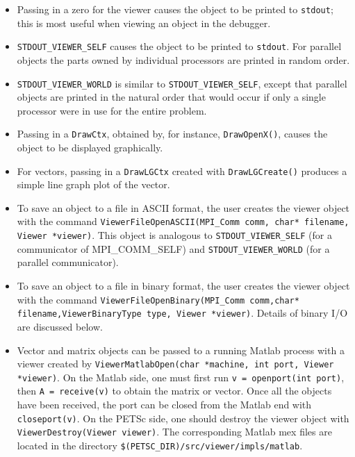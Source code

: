 \begin{itemize}
\item Passing in a zero for the viewer causes the object to be printed 
      to {\tt stdout}; this is most useful when viewing an object in 
      the debugger.
\item {\tt STDOUT\_VIEWER\_SELF} 
      causes the object to be printed to {\tt stdout}.
      For parallel objects the parts owned by individual processors are 
      printed in random order.
\item {\tt STDOUT\_VIEWER\_WORLD} 
      is similar to {\tt STDOUT\_VIEWER\_SELF}, except that 
      parallel objects are printed in the natural order that would occur
      if only a single processor were in use for the entire problem.
\item Passing in a {\tt DrawCtx}, obtained by, for instance, 
      {\tt DrawOpenX()}, causes the object to be displayed graphically.
\item For vectors, passing in a {\tt DrawLGCtx} created with 
      {\tt DrawLGCreate()} produces a simple line graph plot of the vector.
\item To save an object to a file in ASCII format, the user creates
      the viewer object with the command
      {\tt ViewerFileOpenASCII(MPI\_Comm comm, char* filename, Viewer *viewer)}.  
      This object is 
      analogous to {\tt STDOUT\_VIEWER\_SELF} (for a communicator of
      MPI\_COMM\_SELF) and 
      {\tt STDOUT\_VIEWER\_WORLD} (for a parallel communicator).
\item To save an object to a file in binary format, the user creates
      the viewer object with the command
      {\tt ViewerFileOpenBinary(MPI\_Comm comm,char* filename,ViewerBinaryType type,
      Viewer *viewer)}.   Details of binary
      I/O are discussed below.
\item Vector and matrix objects can be passed to a running Matlab process
      with a viewer created by {\tt ViewerMatlabOpen(char *machine,
      int port, Viewer *viewer)}.  On the 
      Matlab side, one must first run {\tt v = openport(int port)}, then 
      {\tt A = receive(v)} to obtain the matrix or vector. Once all the 
      objects have been received, the port can be closed from the 
      Matlab end with {\tt closeport(v)}. On the PETSc side, one should
      destroy the viewer object with 
      {\tt ViewerDestroy(Viewer viewer)}. The corresponding Matlab mex 
      files are located in the directory 
      {\tt \$(PETSC\_DIR)/src/viewer/impls/matlab}.
\end{itemize}

